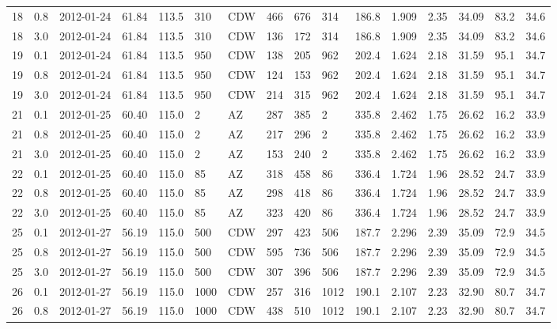 {{\begin{landscape}
\begin{longtable}{llllllllllllllll}
18 & 0.8 & 2012-01-24 & \textminus{}61.84 & 113.5 & 310 & CDW & 466 & 676 & 314 & 186.8 & 1.909 & 2.35 & 34.09 & 83.2 & 34.6\\
18 & 3.0 & 2012-01-24 & \textminus{}61.84 & 113.5 & 310 & CDW & 136 & 172 & 314 & 186.8 & 1.909 & 2.35 & 34.09 & 83.2 & 34.6\\
19 & 0.1 & 2012-01-24 & \textminus{}61.84 & 113.5 & 950 & CDW & 138 & 205 & 962 & 202.4 & 1.624 & 2.18 & 31.59 & 95.1 & 34.7\\
19 & 0.8 & 2012-01-24 & \textminus{}61.84 & 113.5 & 950 & CDW & 124 & 153 & 962 & 202.4 & 1.624 & 2.18 & 31.59 & 95.1 & 34.7\\
19 & 3.0 & 2012-01-24 & \textminus{}61.84 & 113.5 & 950 & CDW & 214 & 315 & 962 & 202.4 & 1.624 & 2.18 & 31.59 & 95.1 & 34.7\\
21 & 0.1 & 2012-01-25 & \textminus{}60.40 & 115.0 & 2 & AZ & 287 & 385 & 2 & 335.8 & 2.462 & 1.75 & 26.62 & 16.2 & 33.9\\
21 & 0.8 & 2012-01-25 & \textminus{}60.40 & 115.0 & 2 & AZ & 217 & 296 & 2 & 335.8 & 2.462 & 1.75 & 26.62 & 16.2 & 33.9\\
21 & 3.0 & 2012-01-25 & \textminus{}60.40 & 115.0 & 2 & AZ & 153 & 240 & 2 & 335.8 & 2.462 & 1.75 & 26.62 & 16.2 & 33.9\\
22 & 0.1 & 2012-01-25 & \textminus{}60.40 & 115.0 & 85 & AZ & 318 & 458 & 86 & 336.4 & 1.724 & 1.96 & 28.52 & 24.7 & 33.9\\
22 & 0.8 & 2012-01-25 & \textminus{}60.40 & 115.0 & 85 & AZ & 298 & 418 & 86 & 336.4 & 1.724 & 1.96 & 28.52 & 24.7 & 33.9\\
22 & 3.0 & 2012-01-25 & \textminus{}60.40 & 115.0 & 85 & AZ & 323 & 420 & 86 & 336.4 & 1.724 & 1.96 & 28.52 & 24.7 & 33.9\\
25 & 0.1 & 2012-01-27 & \textminus{}56.19 & 115.0 & 500 & CDW & 297 & 423 & 506 & 187.7 & 2.296 & 2.39 & 35.09 & 72.9 & 34.5\\
25 & 0.8 & 2012-01-27 & \textminus{}56.19 & 115.0 & 500 & CDW & 595 & 736 & 506 & 187.7 & 2.296 & 2.39 & 35.09 & 72.9 & 34.5\\
25 & 3.0 & 2012-01-27 & \textminus{}56.19 & 115.0 & 500 & CDW & 307 & 396 & 506 & 187.7 & 2.296 & 2.39 & 35.09 & 72.9 & 34.5\\
26 & 0.1 & 2012-01-27 & \textminus{}56.19 & 115.0 & 1000 & CDW & 257 & 316 & 1012 & 190.1 & 2.107 & 2.23 & 32.90 & 80.7 & 34.7\\
26 & 0.8 & 2012-01-27 & \textminus{}56.19 & 115.0 & 1000 & CDW & 438 & 510 & 1012 & 190.1 & 2.107 & 2.23 & 32.90 & 80.7 & 34.7\\

\end{longtable}
\end{landscape}}}

